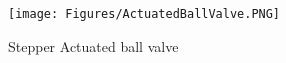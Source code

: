 \begin{enumerate}
\begin{enumerate}
    \begin{figure}[H]
        \centering
        \texttt{[image: Figures/ActuatedBallValve.PNG]}
        \caption{Stepper Actuated ball valve}
        \label{fig:stepper_actuated_ball_valve}
    \end{figure}
    
    
     
    \end{enumerate}
    

\end{enumerate}
